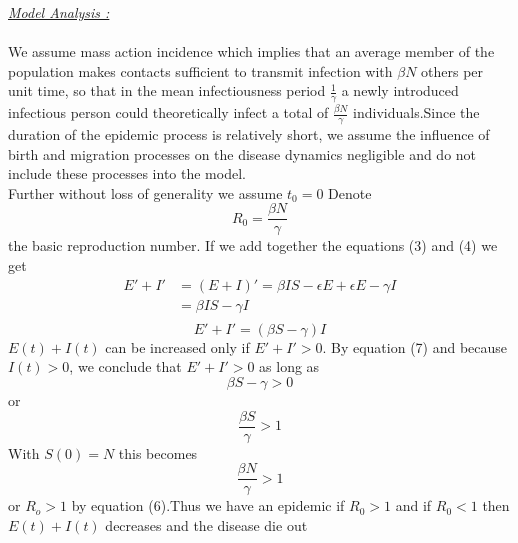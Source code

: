\documentclass{exam}
\begin{document}
\begin{itemize}
\textit{\underline{ Model Analysis :\\}}\\
We assume mass action incidence which implies that an average member of the population makes contacts sufficient to transmit infection with $\beta N$ others per unit time, so that in the mean infectiousness period $\frac{1}{\gamma}$ a newly introduced infectious person could theoretically infect a total of $\frac{\beta N}{\gamma}$ individuals.Since the duration of the epidemic process is relatively short, we assume the influence of birth and migration processes on the disease dynamics negligible and do not include these processes into the model.\\
Further without loss of generality we assume $t_0 = 0$
 Denote 
\begin{equation}
R_0 = \frac{\beta N}{\gamma}
\end{equation}
the basic reproduction number. If we add together the equations (3) and (4) we get 
\begin{align*}
E' +I' &=(E+I)'=\beta I S -\epsilon E +\epsilon E -\gamma I\\
&=\beta IS- \gamma I \\
\end{align*}
\begin{equation}
E' +I' = (\beta S -\gamma)I
\end{equation}
$E(t) + I(t)$ can be increased only if $E' +  I' >0$. By equation (7) and because $I(t) >0$, we conclude that $E' +  I' >0$ as long as 
\begin{equation*}
\beta S - \gamma >0
\end{equation*}
or\\
\begin{equation}
\frac{\beta S}{\gamma} > 1 
\end{equation}
With $S(0) = N$ this becomes 
\begin{equation*}
\frac{\beta N}{\gamma} > 1 
\end{equation*}
or $R_o >1$ by equation (6).Thus we have an epidemic if $R_0 >1$ and if $R_0 <1$ then $E(t) + I(t)$ decreases and the disease  die out \\


\end{itemize}
\end{document}

